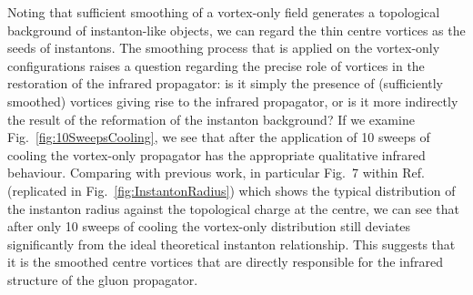 %
Noting that sufficient smoothing of a vortex-only field generates a topological background of instanton-like objects, we can regard the thin centre vortices as the seeds of instantons. The smoothing process that is applied on the vortex-only configurations raises a question regarding the precise role of vortices in the restoration of the infrared propagator: is it simply the presence of (sufficiently smoothed) vortices giving rise to the infrared propagator, or is it more indirectly the result of the reformation of the instanton background? If we examine Fig.~\ref{fig:10SweepsCooling}, we see that after the application of 10 sweeps of cooling the vortex-only propagator has the appropriate qualitative infrared behaviour. Comparing with previous work, in particular Fig.~7 within Ref.~\cite{Trewartha:2015ida} (replicated in Fig.~\ref{fig:InstantonRadius}) which shows the typical distribution of the instanton radius against the topological charge at the centre, we can see that after only 10 sweeps of cooling the vortex-only distribution still deviates significantly from the ideal theoretical instanton relationship. This suggests that it is the smoothed centre vortices that are directly responsible for the infrared structure of the gluon propagator.